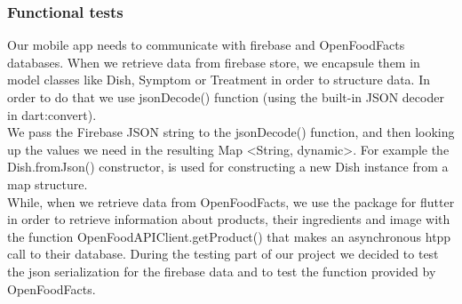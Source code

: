 \documentclass [12pt]{article}
\begin{document}
\subsubsection{Functional tests}
Our mobile app  needs to communicate with firebase and OpenFoodFacts databases. When we retrieve data from firebase store, we encapsule them in model classes like Dish, Symptom or Treatment in order to structure data. In order to do that we use jsonDecode() function (using the built-in JSON decoder in dart:convert).
\\
We pass the Firebase  JSON string  to the jsonDecode() function, and then looking up the values we need in the resulting Map \textless String, dynamic\textgreater. 
For example the Dish.fromJson() constructor, is used for constructing a new Dish instance from a map structure. \\
While, when we retrieve data from OpenFoodFacts, we use the package for flutter in order to  retrieve information about products, their ingredients and image with the function OpenFoodAPIClient.getProduct() that makes an asynchronous htpp call to their database.
During the testing part of our project we decided to test the json serialization for the firebase data and to test the function provided by OpenFoodFacts.
\end{document}
